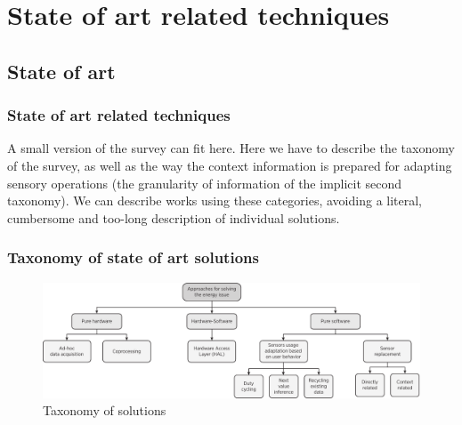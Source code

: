 \documentclass[compress,9pt,xcolor={dvipsnames,table}]{beamer}
\begin{document}
\section{State of art related techniques}
\subsection{State of art}
\begin{frame}[t]\frametitle{State of art related techniques}
A small version of the survey can fit here.
Here we have to describe the taxonomy of the survey, as well as the way the context information is prepared for adapting sensory operations (the granularity of information of the implicit second taxonomy).
We can describe works using these categories, avoiding a literal, cumbersome and too-long description of individual solutions.
\end{frame}

\begin{frame}\frametitle{Taxonomy of state of art solutions}
\begin{figure}[tb]
  \centering
  \includegraphics[width=\textwidth]{../../../resources/images/vectors/approaches-taxonomy}
  \caption{Taxonomy of solutions}
  \label{fig:taxonomy}
\end{figure}
\end{frame}
\end{document}
